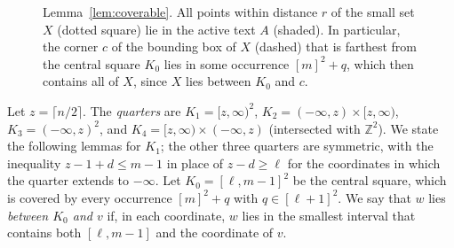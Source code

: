 \documentclass[11pt]{article}
\theoremstyle{definition}
\newcommand{\Z}{\mathbb{Z}}
\begin{document}
\begin{figure}[t]
  \centering
  \caption{Lemma~\ref{lem:coverable}.
    All points within distance $r$ of the small set $X$ (dotted square) lie in the active text $A$ (shaded).
    In particular, the corner $c$ of the bounding box of $X$ (dashed) that is farthest from the central square $K_0$ lies in some occurrence $[m]^2 + q$, which then contains all of $X$, since $X$ lies between $K_0$ and $c$.}
  \label{fig:coverable}
\end{figure}

Let $z = \lceil n/2 \rceil$.
The \emph{quarters} are $K_1 = [z,\infty)^2$, $K_2 = (-\infty, z) \times [z, \infty)$, $K_3 = (-\infty, z)^2$, and $K_4 = [z, \infty) \times (-\infty, z)$ (intersected with $\Z^2$).
We state the following lemmas for $K_1$; the other three quarters are symmetric, with the inequality $z - 1 + d \le m - 1$ in place of $z - d \ge \ell$ for the coordinates in which the quarter extends to $-\infty$.
Let $K_0 = [\ell, m-1]^2$ be the central square, which is covered by every occurrence $[m]^2 + q$ with $q \in [\ell+1]^2$.
We say that $w$ lies \emph{between $K_0$ and $v$} if, in each coordinate, $w$ lies in the smallest interval that contains both $[\ell, m-1]$ and the coordinate of $v$.
\end{document}
